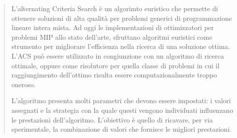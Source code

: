 \begin{abstract}
L'alternating Criteria Search è un algorimto euristico che permette di ottenere
soluzioni di alta qualità per problemi generici di programmazione lineare intera
mista.
Ad oggi le implementazioni di ottimizzatori per problemi MIP allo stato dell'arte,
sfruttano algoritmi euristici come strumento per migliorare l'efficienza nella
ricerca di una soluzione ottima.
L'ACS può essere utilizzato in congiunzione con un algoritmo di ricerca ottimale,
oppure come risolutore per quella classe di problemi in
cui il raggiungimento dell'ottimo risulta essere computazionalmente troppo oneroso.

L'algoritmo presenta molti parametri che devono essere impostati: 
i valori assegnati e la strategia con la quale questi vengono individuati
influenzano le prestazioni dell'algoritmo.
L'obiettivo è quello di ricavare, per via sperimentale, la combinazione di
valori che fornisce le migliori prestazioni.
\end{abstract}
